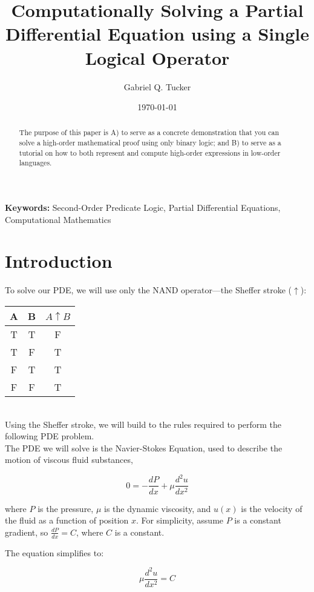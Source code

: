\documentclass[12pt]{article}
\title{Computationally Solving a Partial Differential Equation using a Single Logical Operator}
\author[1]{Gabriel Q. Tucker}
\affil[1]{The Ohio State University, Department of Philosophy}
\affil[2]{Columbus, OH, United States}
\date{\today}
\begin{document}
\maketitle

\begin{abstract}
The purpose of this paper is A) to serve as a concrete demonstration that you can solve a high-order mathematical proof using only binary logic; and B) to serve as a tutorial on how to both represent and compute high-order expressions in low-order languages.
\end{abstract}

\vspace{0.5cm}
\noindent \textbf{Keywords:} Second-Order Predicate Logic, Partial Differential Equations, Computational Mathematics

\section{Introduction}
To solve our PDE, we will use only the NAND operator—the Sheffer stroke ($\uparrow$):\\

\begin{tabular}{cc|c}
A & B & \({A \uparrow B} \) \\ \hline
T & T & F \\
T & F & T \\
F & T & T \\
F & F & T \\
\end{tabular}\\

Using the Sheffer stroke, we will build to the rules required to perform the following PDE problem.\\

The PDE we will solve is the Navier-Stokes Equation, used to describe the motion of viscous fluid substances,

\begin{equation}
0 = -\frac{dP}{dx} + \mu \frac{d^2u}{dx^2}
\end{equation}

where $P$ is the pressure, $\mu$ is the dynamic viscosity, and $u(x)$ is the velocity of the fluid as a function of position $x$. For simplicity, assume $P$ is a constant gradient, so $\frac{dP}{dx} = C$, where $C$ is a constant.

The equation simplifies to:

\begin{equation}
\mu \frac{d^2u}{dx^2} = C
\end{equation}
\end{document}
